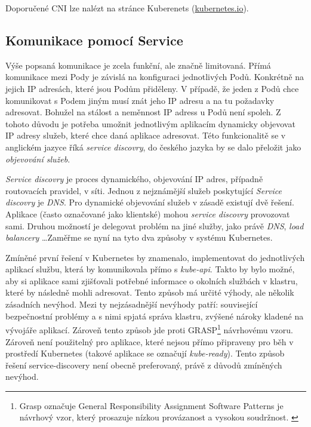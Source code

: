 \cite{thekubernetesauthors_2022_cluster} 
Doporučené CNI lze nalézt na stránce Kuberenets (\href{https://kubernetes.io/docs/concepts/cluster-administration/addons/#networking-and-network-policy}{kubernetes.io}).

\subsection{Komunikace pomocí Service}
Výše popsaná komunikace je zcela funkční, ale značně limitovaná. Přímá komunikace mezi Pody je závislá na konfiguraci jednotlivých Podů. Konkrétně na jejich IP adresách, které jsou Podům přiděleny. V případě, že jeden z Podů chce komunikovat s Podem jiným musí znát jeho IP adresu a na tu požadavky adresovat. Bohužel na stálost a neměnnost IP adress u Podů není spoleh. Z tohoto důvodu je potřeba umožnit jednotlivým aplikacím dynamicky objevovat IP adresy služeb, které chce daná aplikace adresovat. Této funkcionalitě se v anglickém jazyce říká \textit{service discovry}, do českého jazyka by se dalo přeložit jako \textit{objevování služeb}. 

\textit{Service discovry} je proces dynamického, objevování IP adres, případně routovacích pravidel, v síti. Jednou z nejznámější služeb poskytující \textit{Service discovry} je \textit{DNS}. Pro dynamické objevování služeb v zásadě existují dvě řešení. Aplikace (často označované jako klientské) mohou \textit{service discovry} provozovat sami. Druhou možností je delegovat problém na jiné služby, jako právě \textit{DNS}, \textit{load balancery} \ldots Zaměřme se nyní na tyto dva způsoby v systému Kubernetes. 

Zmíněné první řešení v Kubernetes by znamenalo, implementovat do jednotlivých aplikací službu, která by komunikovala přímo s \textit{kube-api}. Takto by bylo možné, aby si aplikace sami zjišťovali potřebné informace o okolních službách v klastru, které by následně mohli adresovat. Tento způsob má určité výhody, ale několik zásadních nevýhod. Mezi ty nejzásadnější nevýhody patří: související bezpečnostní problémy a s nimi spjatá správa klastru, zvýšené nároky kladené na vývojáře aplikací. Zároveň tento způsob jde proti GRASP\footnote{Grasp označuje General Responsibility Assignment Software Patterns je návrhový vzor, který prosazuje nízkou provázanost a vysokou soudržnost. \cite{mlejnek_2018_architektonick}} návrhovému vzoru. Zároveň není použitelný pro aplikace, které nejsou přímo připraveny pro běh v prostředí Kubernetes (takové aplikace se označují \textit{kube-ready}). Tento způsob řešení service-discovery není obecně preferovaný, právě z důvodů zmíněných nevýhod.

